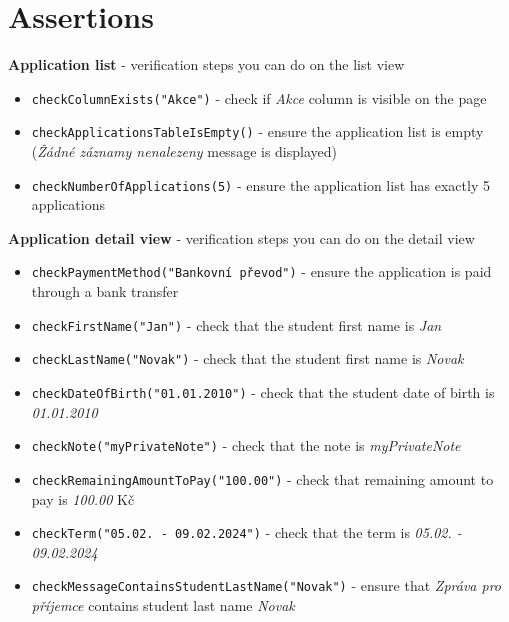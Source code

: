 \documentclass{article}
\let\oldtexttt\texttt
\renewcommand{\texttt}[1]{%
  \colorbox{gray!30}{\oldtexttt{#1}}%
}
\begin{document}
\section*{Assertions}

\textbf{Application list} - verification steps you can do on the list view
\begin{itemize}
  \item \texttt{checkColumnExists("Akce")} - check if \textit{Akce} column is visible on the page
  \item \texttt{checkApplicationsTableIsEmpty()} - ensure the application list is empty (\textit{Žádné záznamy nenalezeny} message is displayed)
  \item \texttt{checkNumberOfApplications(5)} - ensure the application list has exactly 5 applications
\end{itemize}

\textbf{Application detail view} - verification steps you can do on the detail view
\begin{itemize}
  \item \texttt{checkPaymentMethod("Bankovní převod")} - ensure the application is paid through a bank transfer
  \item \texttt{checkFirstName("Jan")} - check that the student first name is \textit{Jan}
  \item \texttt{checkLastName("Novak")} - check that the student first name is \textit{Novak}
  \item \texttt{checkDateOfBirth("01.01.2010")} - check that the student date of birth is \textit{01.01.2010}
  \item \texttt{checkNote("myPrivateNote")} - check that the note is \textit{myPrivateNote}
  \item \texttt{checkRemainingAmountToPay("100.00")} - check that remaining amount to pay is \textit{100.00} Kč
  \item \texttt{checkTerm("05.02. - 09.02.2024")} - check that the term is \textit{05.02. - 09.02.2024}
  \item \texttt{checkMessageContainsStudentLastName("Novak")} - ensure that \textit{Zpráva pro příjemce} contains student last name \textit{Novak}
\end{itemize}
\end{document}
